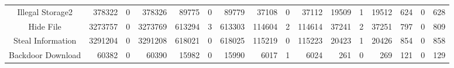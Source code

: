 \begin{table*}[t]
{\begin{tabular}{c|rrr|rrr|rrr|rrr|rrr}
Illegal Storage2     & 378322                                      & 0                                           & 378326                                    & 89775                                       & 0                                           & 89779                                     & 37108                                       & 0                                           & 37112                                     & 19509                                       & 1                                           & 19512                                     & 624                                         & 0                                           & 628                                      \\
Hide File            & 3273757                                     & 0                                           & 3273769                                   & 613294                                      & 3                                           & 613303                                    & 114604                                      & 2                                           & 114614                                    & 37241                                       & 2                                           & 37251                                     & 797                                         & 0                                           & 809                                      \\
Steal Information    & 3291204                                     & 0                                           & 3291208                                   & 618021                                      & 0                                           & 618025                                    & 115219                                      & 0                                           & 115223                                    & 20423                                       & 1                                           & 20426                                     & 854                                         & 0                                           & 858                                      \\
Backdoor Download    & 60382                                       & 0                                           & 60390                                     & 15982                                       & 0                                           & 15990                                     & 6017                                        & 1                                           & 6024                                      & 261                                         & 0                                           & 269                                       & 121                                         & 0                                           & 129                                      \\

\end{tabular}}
\end{table*}
